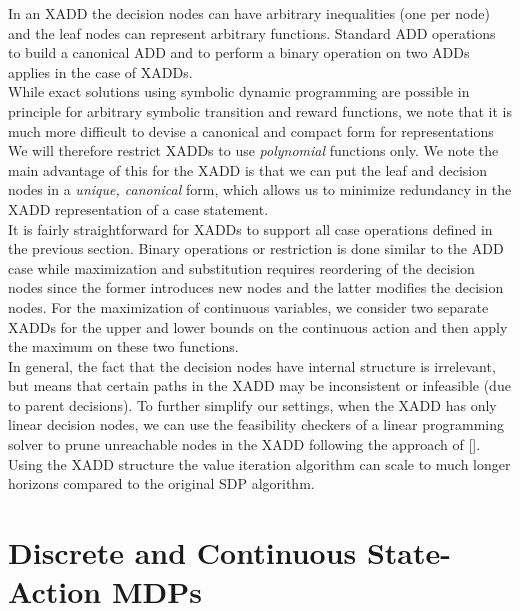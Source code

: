 \documentclass[letterpaper]{article}
\renewcommand{\-}{\text{-}}
\begin{document}
In an XADD the decision nodes can have arbitrary inequalities (one
per node) and the leaf nodes can represent arbitrary functions.
Standard ADD operations to build a canonical ADD and 
to perform a binary operation on two ADDs applies in the case of XADDs.
\\
While exact solutions using symbolic dynamic
programming are possible in principle for arbitrary symbolic transition
and reward functions, we note that it is much more difficult to
devise a canonical and compact form for representations 
We will therefore restrict XADDs to use \emph{polynomial} functions only.  We note the main advantage
of this for the XADD is that we can put the leaf and decision nodes
in a \emph{unique, canonical} form, which allows us to minimize 
redundancy in the XADD representation of a case statement.
\\
It is fairly straightforward for XADDs to support all case operations defined in the previous section. 
Binary operations or restriction is done similar to the ADD case while maximization and substitution 
requires reordering of the decision nodes since the former introduces new nodes and the latter modifies
the decision nodes. 
For the maximization of continuous variables, we consider two separate XADDs for the 
upper and lower bounds on the continuous action and then apply the maximum on these two functions.\\
In general, the fact that the decision nodes have internal structure is irrelevant, but means that certain 
paths in the XADD may be inconsistent or infeasible (due to parent decisions).  To further simplify our settings, 
when the XADD has only linear decision nodes, we can use the feasibility checkers of a linear programming solver 
to prune unreachable nodes in the XADD following the approach of []. Using the XADD structure the value
iteration algorithm can scale to much longer horizons compared to the original SDP algorithm.

\section{Discrete and Continuous State-Action MDPs}
\end{document}
